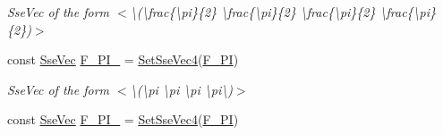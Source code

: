 \begin{DoxyCompactItemize}
\begin{DoxyCompactList}\small\item\em Sse\+Vec of the form $<$\textbackslash{}(\textbackslash{}frac\{\textbackslash{}pi\}\{2\} \textbackslash{}frac\{\textbackslash{}pi\}\{2\} \textbackslash{}frac\{\textbackslash{}pi\}\{2\} \textbackslash{}frac\{\textbackslash{}pi\}\{2\})$>$ \end{DoxyCompactList}\item 
\hypertarget{namespacegofxmath_ac86409a0c7a7979e7ee36396f5a245db}{}const \hyperlink{namespacegofxmath_a634570ddcd2496053ee966227080e02f}{Sse\+Vec} \hyperlink{namespacegofxmath_ac86409a0c7a7979e7ee36396f5a245db}{F\+\_\+\+P\+I\+\_} = \hyperlink{namespacegofxmath_a5c69ea49b97ced58947fec384517442d}{Set\+Sse\+Vec4}(\hyperlink{group___scalar_math_consts_gafafb6dc6f6a78d4380d623b37686827b}{F\+\_\+\+P\+I})\label{namespacegofxmath_ac86409a0c7a7979e7ee36396f5a245db}

\begin{DoxyCompactList}\small\item\em Sse\+Vec of the form $<$\textbackslash{}(\textbackslash{}pi \textbackslash{}pi \textbackslash{}pi \textbackslash{}pi\textbackslash{})$>$ \end{DoxyCompactList}\item 
\hypertarget{namespacegofxmath_a0b4351df875e350c3181a5028184f33c}{}const \hyperlink{namespacegofxmath_a634570ddcd2496053ee966227080e02f}{Sse\+Vec} \hyperlink{namespacegofxmath_a0b4351df875e350c3181a5028184f33c}{F\+\_\+P\+I\+\_} = \hyperlink{namespacegofxmath_a5c69ea49b97ced58947fec384517442d}{Set\+Sse\+Vec4}(\hyperlink{group___scalar_math_consts_ga1f732c1484129c0ec49718665c5334a9}{F\+\_\+P\+I})\label{namespacegofxmath_a0b4351df875e350c3181a5028184f33c}


\end{DoxyCompactItemize}
